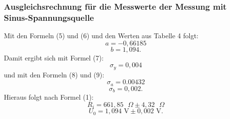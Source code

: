 \subsubsection{Ausgleichsrechnung für die Messwerte der Messung mit Sinus-Spannungsquelle}
Mit den Formeln (5) und (6) und den Werten aus Tabelle 4 folgt:
\begin{displaymath}
a=-0,66185
\end{displaymath}
\begin{displaymath}
b=1,094\text{.}
\end{displaymath}
Damit ergibt sich mit Formel (7):
\begin{displaymath}
\sigma_y=0,004
\end{displaymath}
und mit den Formeln (8) und (9):
\begin{displaymath}
\sigma_a=0.00432
\end{displaymath}
\begin{displaymath}
\sigma_b=0,002\text{.}
\end{displaymath}
Hieraus folgt nach Formel (1):
\begin{displaymath}
R_i=661,85\text{ }\Omega\pm 4,32\text{ }\Omega
\end{displaymath}
\begin{displaymath}
U_0=1,094\text{ V}\pm 0,002\text{ V.}
\end{displaymath}

























































